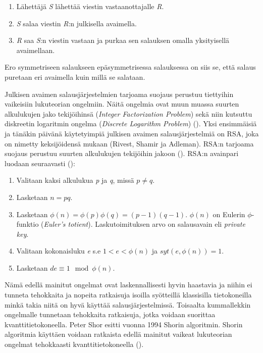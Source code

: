  \begin{enumerate}
     \item Lähettäjä \emph{S} lähettää viestin vastaanottajalle \emph{R}.
     \item \emph{S} salaa viestin \emph{R}:n julkisella avaimella.
     \item \emph{R} saa \emph{S}:n viestin vastaan ja purkaa sen salauksen omalla yksityisellä avaimellaan.
 \end{enumerate}
Ero symmetriseen salaukseen epäsymmetrisessa salauksessa on siis se, että salaus puretaan eri avaimella kuin millä se salataan.
 
  Julkisen avaimen salausjärjestelmien tarjoama suojaus perustuu tiettyihin vaikeisiin lukuteorian ongelmiin. Näitä ongelmia ovat muun muassa suurten alkulukujen jako tekijöihinsä (\emph{Integer Factorization Problem}) sekä niin kutsuttu diskreetin logaritmin ongelma (\emph{Discrete Logarithm Problem}) (\cite{10.1007/978-3-319-11659-4_15}).
  Yksi ensimmäisiä ja tänäkin päivänä käytetyimpiä julkisen avaimen salausjärjestelmiä on RSA, joka on nimetty keksijöidensä mukaan (Rivest, Shamir ja Adleman). RSA:n tarjoama suojaus perustuu suurten alkulukujen tekijöihin jakoon (\cite{montgomery1994survey}). RSA:n avainpari luodaan seuraavasti  (\cite{doi:10.1080/23742917.2016.1226650}):
  
  \begin{enumerate}
      \item Valitaan kaksi alkulukua \emph{p} ja \emph{q}, missä $p \neq q$.
      \item Lasketaan $n = pq$.
      \item Lasketaan $\phi(n) = \phi(p)\phi(q) = (p-1)(q-1)$. $\phi(n)$ on Eulerin $\phi$-funktio (\emph{Euler's totient}). Laskutoimituksen arvo on salausavain eli \emph{private key}.
      \item Valitaan kokonaisluku \emph{e} s.e $1 < e < \phi(n)$ ja $syt(e, \phi(n)) = 1$.
      \item Lasketaan $de \equiv 1 \mod \phi(n)$.
  \end{enumerate}
  
 Nämä edellä mainitut ongelmat ovat laskennallisesti hyvin haastavia ja niihin ei tunneta tehokkaita ja nopeita ratkaisuja isoilla syötteillä klassisilla tietokoneilla minkä takia niitä on hyvä käyttää salausjärjestelmissä. Toisaalta kummallekkin ongelmalle tunnetaan tehokkaita ratkaisuja, jotka voidaan suorittaa kvanttitietokoneella. Peter Shor esitti vuonna 1994 Shorin algoritmin. Shorin algoritmia käyttäen voidaan ratkaista edellä mainitut vaikeat lukuteorian ongelmat tehokkaasti kvanttitietokoneella (\cite{10.1007/978-3-319-11659-4_15}).
 
